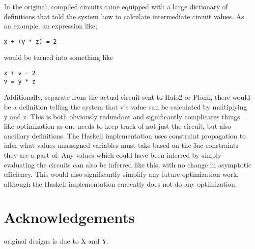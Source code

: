 \documentclass[
    9pt,            
    techreport,       
    affiltop,       
]{art}
\begin{document}
In the original, compiled \VampIR{} circuits came equipped with a large dictionary of definitions that told the system how to calculate intermediate circuit values. As an example, an expression like;

\begin{verbatim}
x + (y * z) = 2
\end{verbatim}
would be turned into something like
\begin{verbatim}
x + v = 2
v = y * z
\end{verbatim}
Additionally, separate from the actual circuit sent to Halo2 or Plonk, there would be a definition telling the system that v's value can be calculated by multiplying y and z. This is both obviously redundant and significantly complicates things like optimization as one needs to keep track of not just the circuit, but also ancillary definitions. The Haskell implementation uses constraint propagation to infer what values unassigned variables must take based on the 3ac constraints they are a part of. Any values which could have been inferred by simply evaluating the circuits can also be inferred like this, with no change in asymptotic efficiency. This would also significantly simplify any future optimization work, although the Haskell implementation currently does not do any optimization.

\section{Acknowledgements}

\VampIR{} original designs is due to X and Y. 
 

\nocite{*}

\end{document}

